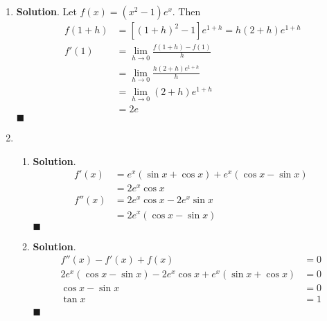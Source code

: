 \documentclass[12pt]{article}
\newenvironment*{sol}{\par \textbf{Solution}.}{\hfill$\blacksquare$}
\begin{document}
\begin{enumerate}
\begin{enumerate}
\begin{enumerate}
\begin{sol}
\begin{align*}
\begin{cases}
                            \theta-\phi=2n\pi-\pi/2\\
                            \theta+\phi=2n\pi-\pi/3
                        \end{cases}\\
                        \implies&\theta=7\pi/12, \phi=11\pi/12
                    \end{align*}
                \end{sol}
            \end{enumerate}
        \end{enumerate}
        \item \begin{sol}
            Let $f(x)=(x^2-1)e^x$. Then \begin{align*}
                f(1+h)&=[(1+h)^2-1]e^{1+h}=h(2+h)e^{1+h}\\
                f'(1)&=\lim_{h\to 0}\frac{f(1+h)-f(1)}{h}\\
                &=\lim_{h\to 0}\frac{h(2+h)e^{1+h}}{h}\\
                &=\lim_{h\to 0}(2+h)e^{1+h}\\
                &=2e
            \end{align*}
        \end{sol}
        \item \begin{enumerate}
            \item \begin{sol}
                \begin{align*}
                    f'(x)&=e^x(\sin{x}+\cos{x})+e^x(\cos{x}-\sin{x})\\
                    &=2e^x\cos{x}\\
                    f''(x)&=2e^x\cos{x}-2e^x\sin{x}\\
                    &=2e^x(\cos{x}-\sin{x})
                \end{align*}
            \end{sol}
            \item \begin{sol}
                \begin{align*}
                    f''(x)-f'(x)+f(x)&=0\\
                    2e^x(\cos{x}-\sin{x})-2e^x\cos{x}+e^x(\sin{x}+\cos{x})&=0\\
                    \cos{x}-\sin{x}&=0\\
                    \tan{x}&=1\\

\end{align*}
\end{sol}
\end{enumerate}
\end{enumerate}
\end{document}
